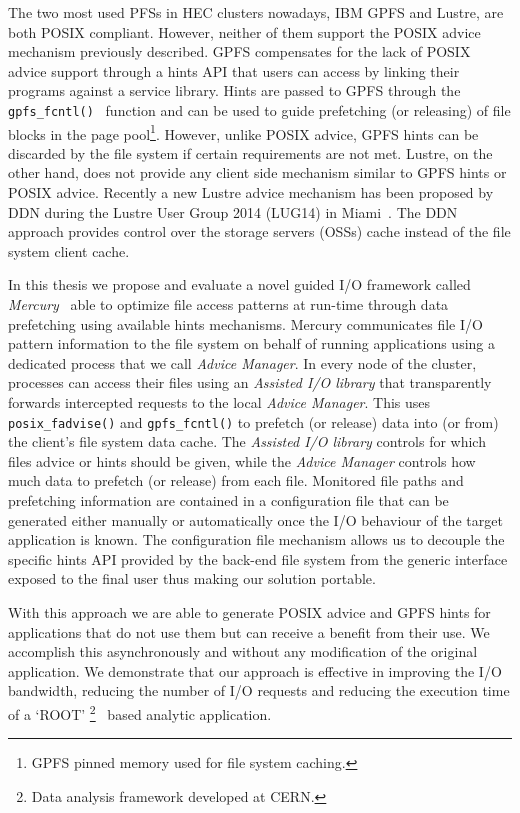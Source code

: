 The two most used PFSs in HEC clusters nowadays, IBM GPFS and Lustre, are both POSIX compliant. However, neither of them support the POSIX advice mechanism previously described. GPFS compensates for the lack of POSIX advice support through a hints API that users can access by linking their programs against a service library. Hints are passed to GPFS through the \texttt{gpfs\_fcntl()}~\cite{GPFSHINTS} function and can be used to guide prefetching (or releasing) of file blocks in the page pool\footnote{GPFS pinned memory used for file system caching.}. However, unlike POSIX advice, GPFS hints can be discarded by the file system if certain requirements are not met. Lustre, on the other hand, does not provide any client side mechanism similar to GPFS hints or POSIX advice. Recently a new Lustre advice mechanism has been proposed by DDN during the Lustre User Group 2014 (LUG14) in Miami~\cite{Comer14}. The DDN approach provides control over the storage servers (OSSs) cache instead of the file system client cache.

In this thesis we propose and evaluate a novel guided I/O framework called \textit{Mercury}~\cite{mercury} able to optimize file access patterns at run-time through data prefetching using available hints mechanisms. Mercury communicates file I/O pattern information to the file system on behalf of running applications using a dedicated process that we call \textit{Advice Manager}. In every node of the cluster, processes can access their files using an \textit{Assisted I/O library} that transparently forwards intercepted requests to the local \textit{Advice Manager}. This uses \texttt{posix\_fadvise()} and \texttt{gpfs\_fcntl()} to prefetch (or release) data into (or from) the client's file system data cache. The \textit{Assisted I/O library} controls for which files advice or hints should be given, while the \textit{Advice Manager} controls how much data to prefetch (or release) from each file. Monitored file paths and prefetching information are contained in a configuration file that can be generated either manually or automatically once the I/O behaviour of the target application is known. The configuration file mechanism allows us to decouple the specific hints API provided by the back-end file system from the generic interface exposed to the final user thus making our solution portable.

With this approach we are able to generate POSIX advice and GPFS hints for applications that do not use them but can receive a benefit from their use. We accomplish this asynchronously and without any modification of the original application. We demonstrate that our approach is effective in improving the I/O bandwidth, reducing the number of I/O requests and reducing the execution time of a `ROOT' \footnote{Data analysis framework developed at CERN.}~\cite{root} based analytic application.


